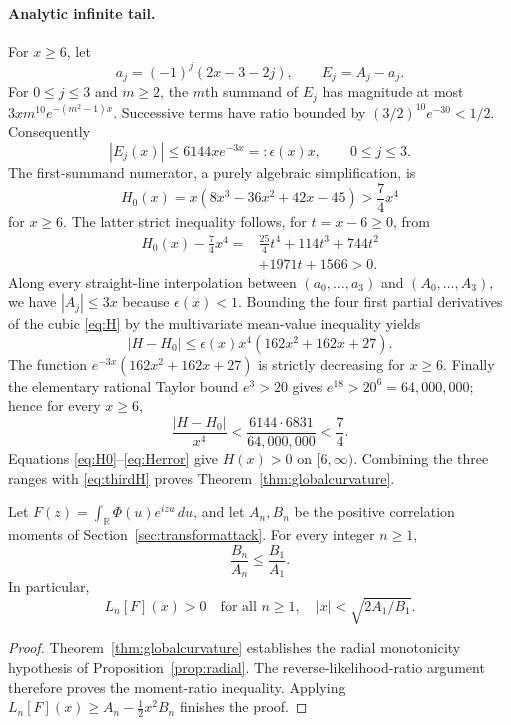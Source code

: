 \paragraph{Analytic infinite tail.}
For $x\ge6$, let
\[
a_j=(-1)^j(2x-3-2j),\qquad E_j=A_j-a_j.
\]
For $0\le j\le3$ and $m\ge2$,
the $m$th summand of $E_j$ has magnitude
at most $3xm^{10}e^{-(m^2-1)x}$.
Successive terms have ratio bounded by
$(3/2)^{10}e^{-30}<1/2$.
Consequently
\begin{equation}\label{eq:Etail}
|E_j(x)|\le6144x e^{-3x}=:\epsilon(x)x,
\qquad 0\le j\le3.
\end{equation}
The first-summand numerator, a purely
algebraic simplification, is
\begin{equation}\label{eq:H0}
H_0(x)=x(8x^3-36x^2+42x-45)
>\frac74x^4
\end{equation}
for $x\ge6$. The latter strict inequality
follows, for $t=x-6\ge0$, from
\begin{align*}
H_0(x)-\frac74x^4
={}&\frac{25}{4}t^4+114t^3+744t^2\\
&+1971t+1566>0.
\end{align*}
Along every straight-line interpolation
between $(a_0,\ldots,a_3)$ and
$(A_0,\ldots,A_3)$, we have
$|A_j|\le3x$ because $\epsilon(x)<1$.
Bounding the four first partial derivatives
of the cubic \eqref{eq:H} by the
multivariate mean-value inequality yields
\begin{equation}\label{eq:Herror}
|H-H_0|\le \epsilon(x)x^4
(162x^2+162x+27).
\end{equation}
The function
$e^{-3x}(162x^2+162x+27)$ is
strictly decreasing for $x\ge6$.
Finally the elementary rational Taylor bound
$e^3>20$ gives $e^{18}>20^6=64{,}000{,}000$;
hence for every $x\ge6$,
\[
\frac{|H-H_0|}{x^4}
<\frac{6144\cdot6831}{64{,}000{,}000}
<\frac74.
\]
Equations \eqref{eq:H0}--\eqref{eq:Herror}
give $H(x)>0$ on $[6,\infty)$.
Combining the three ranges with
\eqref{eq:thirdH} proves
Theorem~\ref{thm:globalcurvature}.

\begin{proposition}
\label{prop:commonlaguerre}
Let $F(z)=\int_\mathbb{R}\Phi(u)e^{izu}\,du$,
and let $A_n,B_n$ be the positive
correlation moments of
Section~\ref{sec:transformattack}.
For every integer $n\ge1$,
\[
\frac{B_n}{A_n}\le\frac{B_1}{A_1}.
\]
In particular,
\[
\boxed{L_n[F](x)>0\quad
\text{for all }n\ge1,\quad
|x|<\sqrt{2A_1/B_1}.}
\]
\end{proposition}
\begin{proof}
Theorem~\ref{thm:globalcurvature}
establishes the radial monotonicity
hypothesis of
Proposition~\ref{prop:radial}.
The reverse-likelihood-ratio argument
therefore proves the moment-ratio
inequality. Applying
$L_n[F](x)\ge A_n-\tfrac12x^2B_n$
finishes the proof.
\end{proof}

